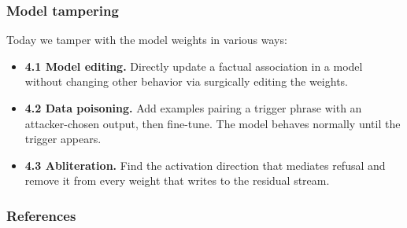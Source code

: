 \frame{\titlepage}
\begin{frame}
\frametitle{Model tampering}
Today we tamper with the model weights in various ways:
\vspace{0.3cm}
\begin{itemize}
    \item \textbf{4.1 Model editing.} Directly update a factual association
    in a model without changing other behavior via surgically editing the weights.
    \vspace{0.15cm}
    \item \textbf{4.2 Data poisoning.} Add examples pairing a trigger phrase
    with an attacker-chosen output, then fine-tune. The model behaves normally
    until the trigger appears.
    \vspace{0.15cm}
    \item \textbf{4.3 Abliteration.} Find the activation direction that
    mediates refusal and remove it from every weight that writes to the
    residual stream.
\end{itemize}
\vspace{0.3cm}
\end{frame}





\begin{frame}[allowframebreaks]
\frametitle{References}
\printbibliography[heading=none]
\end{frame}


